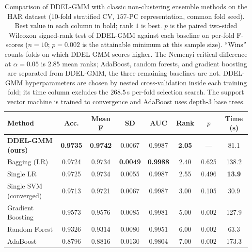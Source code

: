 \documentclass[lettersize,journal]{IEEEtran}
\begin{document}
		\begin{table}[htbp]
			\begin{center}
				\caption{Comparison of DDEL-GMM with classic non-clustering ensemble methods on the HAR dataset ($10$-fold stratified CV, $157$-PC representation, common fold seed). Best value in each column in bold; rank $1$ is best. $p$ is the paired two-sided Wilcoxon signed-rank test of DDEL-GMM against each baseline on per-fold F-scores ($n=10$; $p=0.002$ is the attainable minimum at this sample size). ``Wins'' counts folds on which DDEL-GMM scores higher. The Nemenyi critical difference at $\alpha=0.05$ is $2.85$ mean ranks; AdaBoost, random forests, and gradient boosting are separated from DDEL-GMM, the three remaining baselines are not. DDEL-GMM hyperparameters are chosen by nested cross-validation inside each training fold; its time column excludes the $268.5$\,s per-fold selection search. The support vector machine is trained to convergence and AdaBoost uses depth-$3$ base trees.}
				\label{tab:noclustering}
				\setlength{\tabcolsep}{2.5pt}
				\begin{tabular}{|l|c|c|c|c|c|c|c|}
					\hline
					\textbf{Method} & \textbf{Acc.} & \textbf{Mean F} & \textbf{SD} & \textbf{AUC} & \textbf{Rank} & \textbf{$p$} & \textbf{Time (s)} \\
					\hline
					\textbf{DDEL-GMM (ours)} & \textbf{0.9735} & \textbf{0.9742} & 0.0067 & 0.9987 & \textbf{2.05} & --- & 81.1 \\
					\hline
					Bagging (LR) \cite{breiman_bagging_1996} & 0.9724 & 0.9734 & \textbf{0.0049} & \textbf{0.9988} & 2.40 & 0.625 & 138.2 \\
					\hline
					Single LR & 0.9725 & 0.9734 & 0.0055 & 0.9987 & 2.55 & 0.496 & \textbf{13.9} \\
					\hline
					Single SVM (converged) & 0.9713 & 0.9721 & 0.0067 & 0.9987 & 3.00 & 0.105 & 30.9 \\
					\hline
					Gradient Boosting \cite{friedman_greedy_2001} & 0.9573 & 0.9576 & 0.0085 & 0.9981 & 5.00 & 0.002 & 127.9 \\
					\hline
					Random Forest \cite{breiman_random_2001} & 0.9326 & 0.9314 & 0.0080 & 0.9951 & 6.00 & 0.002 & 63.3 \\
					\hline
					AdaBoost \cite{freund_decision-theoretic_1997} & 0.8796 & 0.8816 & 0.0130 & 0.9804 & 7.00 & 0.002 & 173.3 \\
					\hline
				\end{tabular}
			\end{center}
		\end{table}
		
\end{document}
